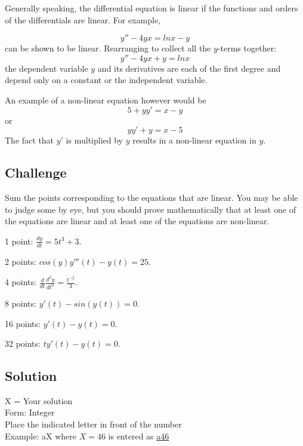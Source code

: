 Generally speaking, the differential equation is linear if the functions and orders of the differentials are linear. For example, 

\begin{equation*}
    y'' - 4yx = ln x - y
\end{equation*}
can be shown to be linear. Rearranging to collect all the $y$-terms together:
\begin{equation*}
    y'' - 4yx + y = ln x
\end{equation*}
the dependent variable $y$ and its derivatives are each of the first degree and depend only on a constant or the independent variable.

An example of a non-linear equation however would be
\begin{equation*}
    5 + yy' = x - y
\end{equation*}
or
\begin{equation*}
    yy' + y = x - 5
\end{equation*}
The fact that $y'$ is multiplied by $y$ results in a non-linear equation in $y$.

\subsection*{Challenge}
Sum the points corresponding to the equations that are linear. You may be able to judge some by eye, but you should prove mathematically that at least one of the equations are linear and at least one of the equations are non-linear.

1 point: $\displaystyle \frac{dy}{dt} = 5t^3 + 3$.

2 points: $\displaystyle cos(y) y'''(t) - y(t) = 25$.

4 points: $\displaystyle \frac{d}{dt} \frac{d^2 y}{dt^2} = \frac{t^{-2}}{3}$.

8 points: $\displaystyle y'(t) - sin(y(t)) = 0$.

16 points: $\displaystyle y'(t) - y(t) = 0$.

32 points: $\displaystyle t y'(t) - y(t) = 0$.

\subsection*{Solution}
X = Your solution\\
Form: Integer\\
Place the indicated letter in front of the number\\
Example: aX where $X=46$ is entered as \href{http://www.wolframalpha.com/input/?i=md5+hash+of+\%22a46\%22}{a46}

